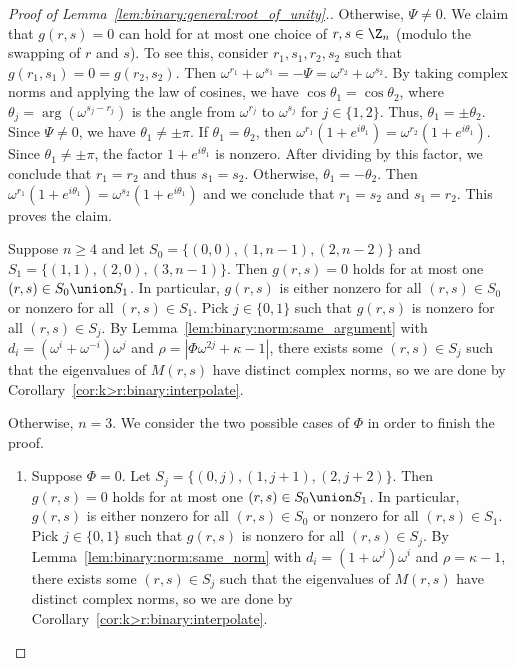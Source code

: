 \documentclass[11pt]{article}
\begin{document}
\begin{proof}[Proof of Lemma~\ref{lem:binary:general:root_of_unity}.]
 Otherwise, $\Psi \ne 0$.
 We claim that $g(r,s) = 0$ can hold for at most one choice of $r,s \in \Z_n$ (modulo the swapping of $r$ and $s$).
 To see this, consider $r_1, s_1, r_2, s_2$ such that $g(r_1, s_1) = 0 = g(r_2, s_2)$.
 Then $\omega^{r_1} + \omega^{s_1} = -\Psi = \omega^{r_2} + \omega^{s_2}$.
 By taking complex norms and applying the law of cosines,
 we have $\cos \theta_1 = \cos \theta_2$,
 where $\theta_j = \arg(\omega^{s_j - r_j})$ is the angle from $\omega^{r_j}$ to $\omega^{s_j}$ for $j \in \{1,2\}$.
 Thus, $\theta_1 = \pm \theta_2$.
 Since $\Psi \ne 0$, we have $\theta_1 \ne \pm \pi$.
 If $\theta_1 = \theta_2$,
 then $\omega^{r_1} (1 + e^{i \theta_1}) = \omega^{r_2} (1 + e^{i \theta_1})$.
 Since $\theta_1 \ne \pm \pi$,
 the factor $1 + e^{i \theta_1}$ is nonzero.
 After dividing by this factor,
 we conclude that $r_1 = r_2$ and thus $s_1 = s_2$.
 Otherwise, $\theta_1 = -\theta_2$.
 Then $\omega^{r_1} (1 + e^{i \theta_1}) = \omega^{s_2} (1 + e^{i \theta_1})$ and we conclude that $r_1 = s_2$ and $s_1 = r_2$.
 This proves the claim.
 
 Suppose $n \ge 4$ and let $S_0 = \{(0,0), (1, n-1), (2, n-2)\}$ and $S_1 = \{(1,1), (2, 0), (3, n-1)\}$.
 Then $g(r,s) = 0$ holds for at most one $(r,s) \in S_0 \union S_1$.
 In particular, $g(r,s)$ is either nonzero for all $(r,s) \in S_0$ or nonzero for all $(r,s) \in S_1$.
 Pick $j \in \{0,1\}$ such that $g(r,s)$ is nonzero for all $(r,s) \in S_j$.
 By Lemma~\ref{lem:binary:norm:same_argument} with $d_i = (\omega^i + \omega^{-i}) \omega^j$ and $\rho = |\Phi \omega^{2j} + \kappa - 1|$,
 there exists some $(r,s) \in S_j$ such that the eigenvalues of $M(r, s)$ have distinct complex norms,
 so we are done by Corollary~\ref{cor:k>r:binary:interpolate}.
 
 Otherwise, $n = 3$.
 We consider the two possible cases of $\Phi$ in order to finish the proof.
 \begin{enumerate}
  \item Suppose $\Phi = 0$.
  Let $S_j = \{(0,j), (1,j+1), (2,j+2)\}$.
  Then $g(r,s) = 0$ holds for at most one $(r,s) \in S_0 \union S_1$.
  In particular, $g(r,s)$ is either nonzero for all $(r,s) \in S_0$ or nonzero for all $(r,s) \in S_1$.
  Pick $j \in \{0,1\}$ such that $g(r,s)$ is nonzero for all $(r,s) \in S_j$.
  By Lemma~\ref{lem:binary:norm:same_norm} with $d_i = (1 + \omega^j) \omega^i$ and $\rho = \kappa - 1$,
  there exists some $(r,s) \in S_j$ such that the eigenvalues of $M(r, s)$ have distinct complex norms,
  so we are done by Corollary~\ref{cor:k>r:binary:interpolate}.
  

\end{enumerate}
\end{proof}
\end{document}
